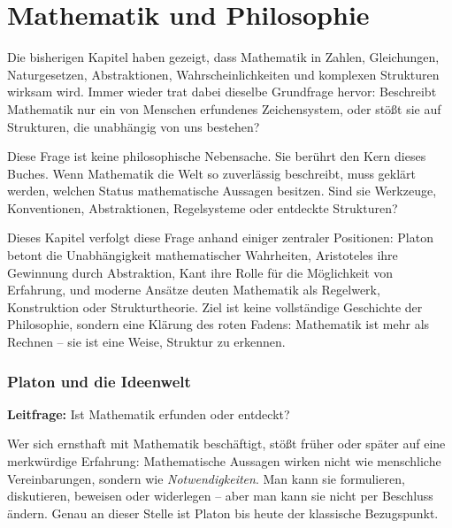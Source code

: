 \chapter{Mathematik und Philosophie}
\label{chap:VIII_philosophie}

Die bisherigen Kapitel haben gezeigt,
dass Mathematik in Zahlen, Gleichungen, Naturgesetzen,
Abstraktionen, Wahrscheinlichkeiten und komplexen Strukturen wirksam wird.
Immer wieder trat dabei dieselbe Grundfrage hervor:
Beschreibt Mathematik nur ein von Menschen erfundenes Zeichensystem,
oder stößt sie auf Strukturen,
die unabhängig von uns bestehen?

Diese Frage ist keine philosophische Nebensache.
Sie berührt den Kern dieses Buches.
Wenn Mathematik die Welt so zuverlässig beschreibt,
muss geklärt werden,
welchen Status mathematische Aussagen besitzen.
Sind sie Werkzeuge,
Konventionen,
Abstraktionen,
Regelsysteme
oder entdeckte Strukturen?

Dieses Kapitel verfolgt diese Frage anhand einiger zentraler Positionen:
Platon betont die Unabhängigkeit mathematischer Wahrheiten,
Aristoteles ihre Gewinnung durch Abstraktion,
Kant ihre Rolle für die Möglichkeit von Erfahrung,
und moderne Ansätze deuten Mathematik als Regelwerk,
Konstruktion oder Strukturtheorie.
Ziel ist keine vollständige Geschichte der Philosophie,
sondern eine Klärung des roten Fadens:
Mathematik ist mehr als Rechnen --
sie ist eine Weise,
Struktur zu erkennen.


\subsection{Platon und die Ideenwelt}
\label{sec:8.1}

\textbf{Leitfrage:} Ist Mathematik erfunden oder entdeckt?

\medskip

Wer sich ernsthaft mit Mathematik beschäftigt,
stößt früher oder später auf eine merkwürdige Erfahrung:
Mathematische Aussagen wirken nicht wie menschliche Vereinbarungen,
sondern wie \emph{Notwendigkeiten}.
Man kann sie formulieren,
diskutieren,
beweisen oder widerlegen --
aber man kann sie nicht per Beschluss ändern.
Genau an dieser Stelle ist Platon bis heute der klassische Bezugspunkt.


